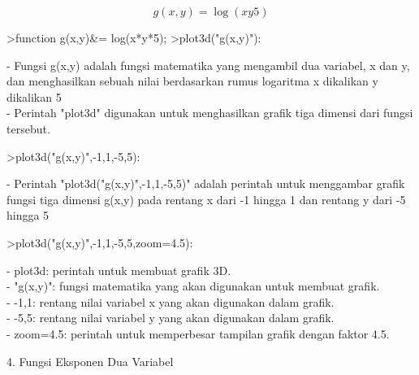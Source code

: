 \documentclass{article}
\begin{document}
\begin{eulernotebook}
\begin{eulercomment}
\begin{eulercomment}
\begin{eulercomment}
\begin{eulercomment}
\begin{eulercomment}
\end{eulercomment}
\begin{eulerformula}
\[
g(x,y) = \log(xy5)
\]
\end{eulerformula}
\begin{eulerprompt}
>function g(x,y)&= log(x*y*5);
>plot3d("g(x,y)"):
\end{eulerprompt}
\begin{eulercomment}
- Fungsi g(x,y) adalah fungsi matematika yang mengambil dua variabel,
x dan y, dan menghasilkan sebuah nilai berdasarkan rumus logaritma x
dikalikan y dikalikan 5\\
- Perintah "plot3d" digunakan untuk menghasilkan grafik tiga dimensi
dari fungsi tersebut.
\end{eulercomment}
\begin{eulerprompt}
>plot3d("g(x,y)",-1,1,-5,5):
\end{eulerprompt}
\begin{eulercomment}
- Perintah "plot3d("g(x,y)",-1,1,-5,5)" adalah perintah untuk
menggambar grafik fungsi tiga dimensi g(x,y) pada rentang x dari -1
hingga 1 dan rentang y dari -5 hingga 5
\end{eulercomment}
\begin{eulerprompt}
>plot3d("g(x,y)",-1,1,-5,5,zoom=4.5):
\end{eulerprompt}
\begin{eulercomment}
- plot3d: perintah untuk membuat grafik 3D.\\
- "g(x,y)": fungsi matematika yang akan digunakan untuk membuat
grafik.\\
- -1,1: rentang nilai variabel x yang akan digunakan dalam grafik.\\
- -5,5: rentang nilai variabel y yang akan digunakan dalam grafik.\\
- zoom=4.5: perintah untuk memperbesar tampilan grafik dengan faktor
4.5.

\end{eulercomment}
\eulersubheading{}
\begin{eulercomment}
4. Fungsi Eksponen Dua Variabel


\end{eulercomment}
\end{eulercomment}
\end{eulercomment}
\end{eulercomment}
\end{eulercomment}
\end{eulernotebook}
\end{document}
